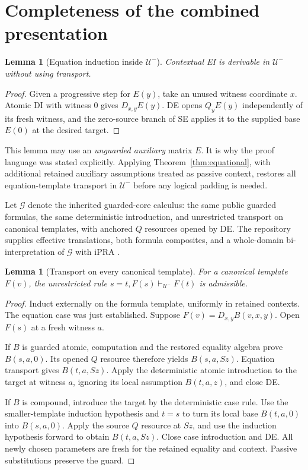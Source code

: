 \documentclass[11pt,letterpaper]{article}
\newtheorem{lemma}[theorem]{Lemma}
\theoremstyle{definition}
\newcommand{\UU}{\mathcal U^{-}}
\newcommand{\GG}{\mathcal G}
\begin{document}
\section{Completeness of the combined presentation}
\label{sec:complete}

\begin{lemma}[Equation induction inside $\UU$]
Contextual EI is derivable in $\UU$ without using transport.
\end{lemma}
\begin{proof}
Given a progressive step for $E(y)$, take an unused witness coordinate
$x$. Atomic DI with witness $0$ gives $D_{x,y}E(y)$. DE opens
$Q_yE(y)$ independently of its fresh witness, and the zero-source branch
of SE applies it to the supplied base $E(0)$ at the desired target.
\end{proof}

This lemma may use an \emph{unguarded auxiliary} matrix $E$. It is why the
proof language was stated explicitly. Applying
Theorem~\ref{thm:equational}, with additional retained auxiliary assumptions
treated as passive context, restores all equation-template transport in
$\UU$ before any logical padding is needed.

Let $\GG$ denote the inherited guarded-core calculus: the same public
guarded formulas, the same deterministic introduction, and unrestricted
transport on canonical templates, with anchored $Q$ resources opened by DE.
The repository supplies effective translations, both formula composites,
and a whole-domain bi-interpretation of $\GG$ with iPRA \cite{guarded}.

\begin{lemma}[Transport on every canonical template]
\label{lem:canonicaltransport}
For a canonical template $F(v)$, the unrestricted rule
$s=t,F(s)\vdash_{\UU}F(t)$ is admissible.
\end{lemma}
\begin{proof}
Induct externally on the formula template, uniformly in retained contexts.
The equation case was just established. Suppose
$F(v)=D_{x,y}B(v,x,y)$. Open $F(s)$ at a fresh witness $a$.

If $B$ is guarded atomic, computation and the restored equality algebra
prove $B(s,a,0)$. Its opened $Q$ resource therefore yields $B(s,a,Sz)$.
Equation transport gives $B(t,a,Sz)$. Apply the deterministic atomic
introduction to the target at witness $a$, ignoring its local assumption
$B(t,a,z)$, and close DE.

If $B$ is compound, introduce the target by the deterministic case rule.
Use the smaller-template induction hypothesis and $t=s$ to turn its local
base $B(t,a,0)$ into $B(s,a,0)$. Apply the source $Q$ resource at $Sz$,
and use the induction hypothesis forward to obtain $B(t,a,Sz)$. Close
case introduction and DE. All newly chosen parameters are fresh for the
retained equality and context. Passive substitutions preserve the guard.
\end{proof}
\end{document}
